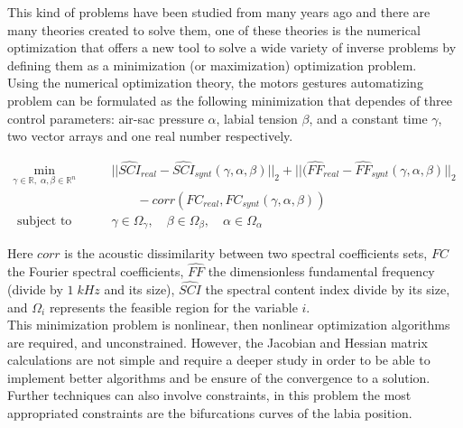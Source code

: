 This kind of problems have been studied from many years ago and there are many theories created to solve them, one of these theories is the numerical optimization that offers a new tool to solve a wide variety of inverse problems by defining them as a minimization (or maximization) optimization problem.\\

Using the numerical optimization theory, the motors gestures automatizing problem can be formulated as the following minimization that dependes of three control parameters: air-sac pressure $\alpha$, labial tension $\beta$, and a constant time $\gamma$, two vector arrays and one real number respectively.

\begin{equation}\label{opt_general}
\begin{aligned}
\underset{ \gamma \in \mathbb{R},\; \alpha,\beta\in \mathbb{R}^n}{\text{min}} &\qquad  ||\hat{SCI}_{real} - \hat{SCI}_{synt} ( \gamma,\alpha,\beta)||_2  + || (\hat{FF}_{real} - \hat{FF}_{synt}(\gamma,\alpha,\beta)||_2 \\
    & \qquad \qquad  - corr(FC_{real},FC_{synt}(\gamma, \alpha, \beta)) \\
    \text { subject to }  & \qquad \gamma \in \Omega_\gamma, \quad  \beta \in \Omega_\beta ,  \quad  \alpha \in \Omega_\alpha
\end{aligned}
\end{equation}

Here $corr$ is the acoustic dissimilarity between two spectral coefficients sets, $FC$ the Fourier spectral coefficients, $\hat{FF}$ the dimensionless fundamental frequency (divide by $1 \; kHz$ and its size), $\hat{SCI}$ the spectral content index divide by its size, and $\Omega_i$ represents the feasible region for the variable $i$.\\

This minimization problem is nonlinear, then nonlinear optimization algorithms are required, and unconstrained. However, the Jacobian and Hessian matrix calculations are not simple and require a deeper study in order to be able to implement better algorithms and be ensure of the convergence to a solution. Further techniques can also involve constraints, in this problem the most appropriated constraints are the bifurcations curves of the labia position.
